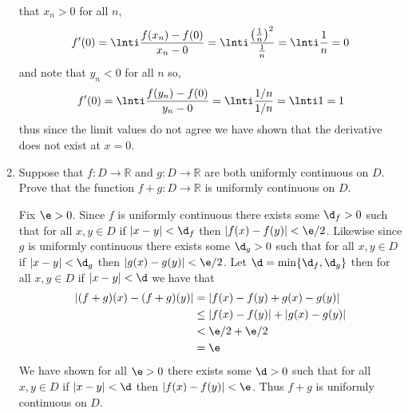 \documentclass[11pt]{exam}
\begin{document}
\begin{enumerate}
\begin{solution}
                that $x_n > 0$ for all $n$,
                $$f'(0) = \lnti \frac{f(x_n) - f(0)}{x_n - 0} = \lnti \frac{\left(\frac{1}{n}\right)^2}{\frac{1}
                {n}} = \lnti \frac{1}{n} = 0$$ 
                and note that $y_n < 0$ for all $n$ so,
                $$f'(0) = \lnti \frac{f(y_n) - f(0)}{y_n - 0} = \lnti \frac{1/n}{1/n} = \lnti 1 = 1$$
                thus since the limit values do not agree we have shown that the derivative does not exist at $x = 
                0$. 
            \end{solution}
        \item Suppose that \(f: D \rightarrow \mathbb{R}\) and \(g: D \rightarrow \mathbb{R}\) are both uniformly continuous on \(D\). Prove that the function \(f + g: D \rightarrow \mathbb{R}\) is uniformly continuous on \(D\).
            \begin{solution}
                Fix $\e > 0$. Since $f$ is uniformly continuous there exists some $\d_f > 0$ 
                such that  for all $x, y \in D$ if $|x - y| < \d_f$ then $|f(x) - f(y)| < \e/2$. Likewise since $g$ is uniformly 
                continuous there exists some $\d_g > 0$ such that for all $x, y \in D$ if $|x - y| < \d_g$ then $|g(x) - g(y)| < \e/2$. Let $\d = \min\{\d_f, \d_g\}$ then for all $x, y \in D$ if $|x-y| < \d$ we have that 
                \begin{align*}
                    |(f+g)(x) - (f+g)(y)| &= |f(x)-f(y) + g(x) - g(y)| \\
                                        &\leq |f(x) - f(y)| + |g(x) - g(y)| \\
                                        &< \e/2 + \e/2 \\
                                        &= \e
                \end{align*}
                We have shown for all $\e > 0$ there exists some $\d > 0$ such that for all $x, y \in D$ if $|x - y| < \d$ then $|f(x) - f(y)| < \e$. Thus $f+g$ is uniformly continuous on $D$.
            \end{solution}





    \end{enumerate}
\end{document}
